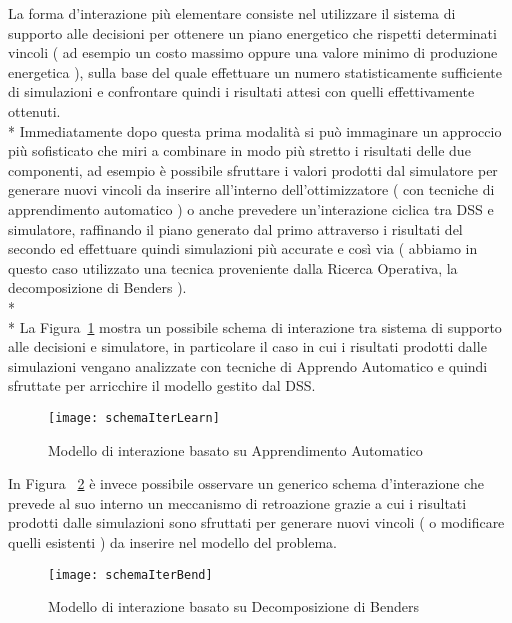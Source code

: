 \documentclass[12pt,a4paper,openright,twoside]{report}
\begin{document}
La forma d'interazione più elementare consiste nel utilizzare il sistema di supporto alle decisioni per ottenere un piano energetico che rispetti determinati vincoli ( ad esempio un costo massimo oppure una valore minimo di produzione energetica ), sulla base del quale effettuare un numero statisticamente sufficiente di simulazioni e confrontare quindi i risultati attesi con quelli effettivamente ottenuti. \\*
Immediatamente dopo questa prima modalità si può immaginare un approccio più sofisticato che miri a combinare in modo più stretto i risultati delle due componenti, ad esempio è possibile sfruttare i valori prodotti  dal simulatore per generare nuovi vincoli da inserire all'interno dell'ottimizzatore ( con tecniche di apprendimento automatico ) o anche prevedere un'interazione ciclica tra DSS e simulatore, raffinando il piano generato dal primo attraverso i risultati del secondo  ed effettuare quindi simulazioni più accurate e così via ( abbiamo in questo caso utilizzato una tecnica proveniente dalla Ricerca Operativa, la decomposizione di Benders ).
\\* \\*
La Figura~\ref{schemaIterLearn} mostra un possibile schema di interazione tra sistema di supporto alle decisioni e simulatore, in particolare il caso in cui i risultati prodotti dalle simulazioni vengano analizzate con tecniche di Apprendo Automatico e quindi sfruttate per arricchire il modello gestito dal DSS.
\begin{figure}[htb]
	\begin{center}
	\texttt{[image: schemaIterLearn]}
	\end{center}
	\caption{Modello di interazione basato su Apprendimento Automatico}
  	\label{schemaIterLearn}
\end{figure}


In Figura ~\ref{schemaIterBend} è invece possibile osservare un generico schema d'interazione che prevede al suo interno un meccanismo di retroazione grazie a cui i risultati prodotti dalle simulazioni sono sfruttati per generare nuovi vincoli ( o modificare quelli esistenti ) da inserire nel modello del problema.
\begin{figure}[htb]
	\begin{center}
	\texttt{[image: schemaIterBend]}
	\end{center}
	\caption{Modello di interazione basato su Decomposizione di Benders}
  	\label{schemaIterBend}
\end{figure}
\end{document}
